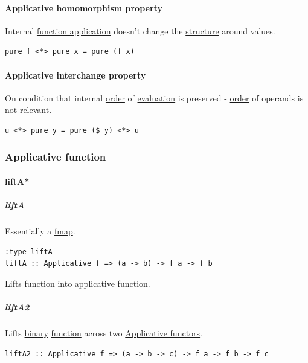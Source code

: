 \documentclass[a4paper,14pt,oneside]{book}
\begin{document}
\paragraph{\label{org48b72e4}Applicative homomorphism property}
\label{sec:org3bd7f4d}
Internal \hyperref[org3337eca]{function application} doesn't change the \hyperref[org156091f]{structure} around values.

\begin{verbatim}
pure f <*> pure x = pure (f x)
\end{verbatim}

\paragraph{\label{orgbf7f9cc}Applicative interchange property}
\label{sec:orgce99f97}
On condition that internal \hyperref[org78e21db]{order} of \hyperref[org59f09a4]{evaluation} is preserved - \hyperref[org78e21db]{order} of operands is not relevant.
\begin{verbatim}
u <*> pure y = pure ($ y) <*> u
\end{verbatim}

\subsubsection{\label{orgd816b28}Applicative function}
\label{sec:org5e450e6}

\paragraph{\label{org65d27a0}liftA*}
\label{sec:orgf87c51d}

\subparagraph{\label{orge5f35f9}liftA}
\label{sec:orgd6e7eae}
Essentially a \hyperref[orgd7386d7]{fmap}.
\begin{verbatim}
:type liftA
liftA :: Applicative f => (a -> b) -> f a -> f b
\end{verbatim}

Lifts \hyperref[org50bbe06]{function} into \hyperref[orgd816b28]{applicative function}.

\subparagraph{\label{orgacea728}liftA2}
\label{sec:orge7172a5}
Lifts \hyperref[orgf1d7c65]{binary} \hyperref[org50bbe06]{function} across two \hyperref[org1a35802]{Applicative functors}.
\begin{verbatim}
liftA2 :: Applicative f => (a -> b -> c) -> f a -> f b -> f c
\end{verbatim}
\end{document}
